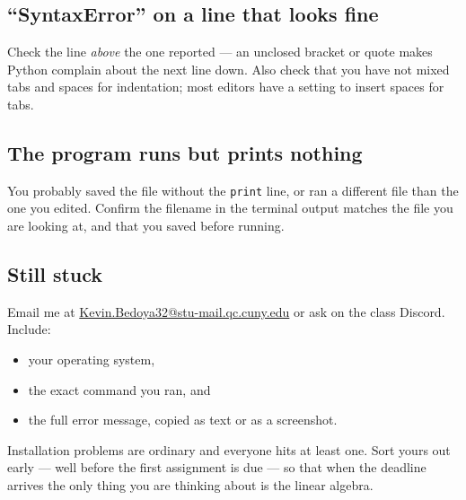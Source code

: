 \documentclass[11pt]{article}
\begin{document}
\subsection{``SyntaxError'' on a line that looks fine}
Check the line \emph{above} the one reported --- an unclosed bracket or quote
makes Python complain about the next line down. Also check that you have not
mixed tabs and spaces for indentation; most editors have a setting to insert
spaces for tabs.

\subsection{The program runs but prints nothing}
You probably saved the file without the \texttt{print} line, or ran a different
file than the one you edited. Confirm the filename in the terminal output
matches the file you are looking at, and that you saved before running.

\subsection{Still stuck}
Email me at \url{Kevin.Bedoya32@stu-mail.qc.cuny.edu} or ask on the class
Discord. Include:

\begin{itemize}[leftmargin=1.4em,itemsep=2pt,topsep=3pt]
  \item your operating system,
  \item the exact command you ran, and
  \item the full error message, copied as text or as a screenshot.
\end{itemize}

\noindent Installation problems are ordinary and everyone hits at least one.
Sort yours out early --- well before the first assignment is due --- so that
when the deadline arrives the only thing you are thinking about is the linear
algebra.
\end{document}
